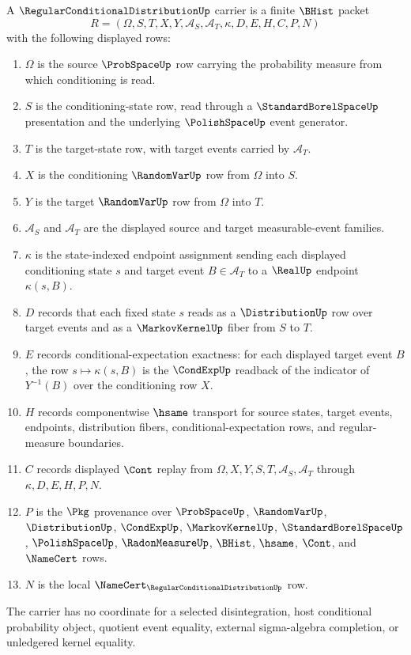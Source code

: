 \begin{definition}
\label{def:regular-conditional-distribution-carrier}
A $\RegularConditionalDistributionUp$ carrier is a finite $\BHist$ packet
$$
R=(\Omega,S,T,X,Y,\mathcal{A}_S,\mathcal{A}_T,\kappa,D,E,H,C,P,N)
$$
with the following displayed rows:
\begin{enumerate}
\item $\Omega$ is the source $\ProbSpaceUp$ row carrying the probability measure from which conditioning is read.
\item $S$ is the conditioning-state row, read through a $\StandardBorelSpaceUp$ presentation and the underlying $\PolishSpaceUp$ event generator.
\item $T$ is the target-state row, with target events carried by $\mathcal{A}_T$.
\item $X$ is the conditioning $\RandomVarUp$ row from $\Omega$ into $S$.
\item $Y$ is the target $\RandomVarUp$ row from $\Omega$ into $T$.
\item $\mathcal{A}_S$ and $\mathcal{A}_T$ are the displayed source and target measurable-event families.
\item $\kappa$ is the state-indexed endpoint assignment sending each displayed conditioning state $s$ and target event $B\in\mathcal{A}_T$ to a $\RealUp$ endpoint $\kappa(s,B)$.
\item $D$ records that each fixed state $s$ reads as a $\DistributionUp$ row over target events and as a $\MarkovKernelUp$ fiber from $S$ to $T$.
\item $E$ records conditional-expectation exactness: for each displayed target event $B$, the row $s\mapsto\kappa(s,B)$ is the $\CondExpUp$ readback of the indicator of $Y^{-1}(B)$ over the conditioning row $X$.
\item $H$ records componentwise $\hsame$ transport for source states, target events, endpoints, distribution fibers, conditional-expectation rows, and regular-measure boundaries.
\item $C$ records displayed $\Cont$ replay from $\Omega,X,Y,S,T,\mathcal{A}_S,\mathcal{A}_T$ through $\kappa,D,E,H,P,N$.
\item $P$ is the $\Pkg$ provenance over $\ProbSpaceUp$, $\RandomVarUp$, $\DistributionUp$, $\CondExpUp$, $\MarkovKernelUp$, $\StandardBorelSpaceUp$, $\PolishSpaceUp$, $\RadonMeasureUp$, $\BHist$, $\hsame$, $\Cont$, and $\NameCert$ rows.
\item $N$ is the local $\NameCert_{\RegularConditionalDistributionUp}$ row.
\end{enumerate}
The carrier has no coordinate for a selected disintegration, host conditional probability object, quotient event equality, external sigma-algebra completion, or unledgered kernel equality.
\end{definition}


